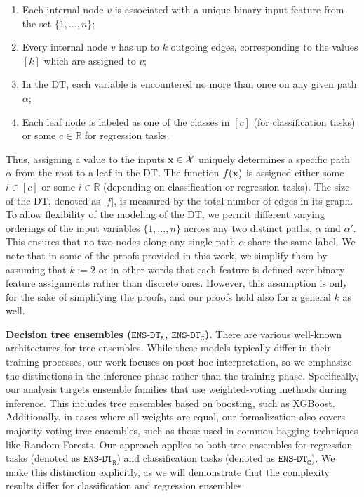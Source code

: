 \begin{enumerate}
	\item Each internal node $v$ is associated with a unique binary input feature from the set $\{1,\ldots,n\}$;
	\item Every internal node $v$ has up to $k$ outgoing edges, corresponding to the values $[k]$ which are assigned to $v$;
	\item In the DT, each variable is encountered no more than once on any given path $\alpha$;
 	\item Each leaf node is labeled as one of the classes in $[c]$ (for classification tasks) or some $c\in\mathbb{R}$ for regression tasks.
\end{enumerate}

Thus, assigning a value to the inputs $\textbf{x}\in\mathcal{X}$ uniquely determines a specific path $\alpha$ from the root to a leaf in the DT. The function $f(\textbf{x})$ is assigned either some $i\in [c]$ or some $i\in \mathbb{R}$ (depending on classification or regression tasks). The size of the DT, denoted as $\vert f \vert$, is measured by the total number of edges in its graph. To allow flexibility of the modeling of the DT, we permit different varying orderings of the input variables $\{1,\ldots,n \}$ across any two distinct paths, $\alpha$ and $\alpha'$. This ensures that no two nodes along any single path $\alpha$ share the same label. We note that in some of the proofs provided in this work, we simplify them by assuming that $k:=2$ or in other words that each feature is defined over binary feature assignments rather than discrete ones. However, this assumption is only for the sake of simplifying the proofs, and our proofs hold also for a general $k$ as well.

\textbf{Decision tree ensembles ($\texttt{ENS-DT}_{\texttt{R}}$, $\texttt{ENS-DT}_{\texttt{C}}$).} There are various well-known architectures for tree ensembles. While these models typically differ in their training processes, our work focuses on post-hoc interpretation, so we emphasize the distinctions in the inference phase rather than the training phase. Specifically, our analysis targets ensemble families that use weighted-voting methods during inference. This includes tree ensembles based on boosting, such as XGBoost. Additionally, in cases where all weights are equal, our formalization also covers majority-voting tree ensembles, such as those used in common bagging techniques like Random Forests. Our approach applies to both tree ensembles for regression tasks (denoted as $\texttt{ENS-DT}_{\texttt{R}}$) and classification tasks (denoted as $\texttt{ENS-DT}_{\texttt{C}}$). We make this distinction explicitly, as we will demonstrate that the complexity results differ for classification and regression ensembles.



